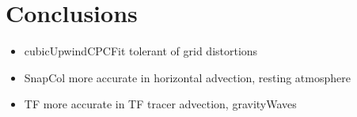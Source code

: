 \chapter{Conclusions}
\begin{itemize}
\item cubicUpwindCPCFit tolerant of grid distortions
\item SnapCol more accurate in horizontal advection, resting atmosphere
\item TF more accurate in TF tracer advection, gravityWaves
\end{itemize}
